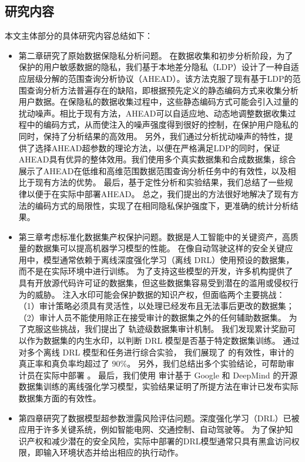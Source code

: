 \subsection{研究内容}
本文主体部分的具体研究内容总结如下：
\begin{itemize}
    \item 第二章研究了原始数据保隐私分析问题。
    在数据收集和初步分析阶段，为了保护的用户敏感数据的隐私，我们基于本地差分隐私（LDP）设计了一种自适应层级分解的范围查询分析协议（AHEAD）。该方法克服了现有基于LDP的范围查询分析方法普遍存在的缺陷，即根据预先定义的静态编码方式来收集分析用户数据。在保隐私的数据收集过程中，这些静态编码方式可能会引入过量的扰动噪声。相比于现有方法，AHEAD可以自适应地、动态地调整数据收集过程中的编码方式，从而使注入的噪声强度得到很好的控制，在保护用户隐私的同时，保持了分析结果的高效用。
    另外，我们通过分析扰动噪声的特性，提供了选择AHEAD超参数的理论方法，以便在严格满足LDP的同时，保证AHEAD具有优异的整体效用。我们使用多个真实数据集和合成数据集，综合展示了AHEAD在低维和高维范围数据范围查询分析任务中的有效性，以及相比于现有方法的优势。
    最后，基于定性分析和实验结果，我们总结了一些规律以便于在实际中部署AHEAD。
    总之，我们提出的方法很好地解决了现有方法的编码方式的局限性，实现了在相同隐私保护强度下，更准确的统计分析结果。
    \item 第三章考虑标准化数据集产权保护问题。数据是人工智能中的关键资产，高质量的数据集可以提高机器学习模型的性能。
    在像自动驾驶这样的安全关键应用中，模型通常依赖于离线深度强化学习（离线 DRL）使用预设的数据集，而不是在实际环境中进行训练。
    为了支持这些模型的开发，许多机构提供了具有开放源代码许可证的数据集，但这些数据集容易受到潜在的滥用或侵权行为的威胁。
    注入水印可能会保护数据的知识产权，但面临两个主要挑战：
    （1）审计策略必须具有灵活性，以处理已经发布且无法事后更改的数据集；
    （2）审计人员不能使用除正在接受审计的数据集之外的任何辅助数据集。
    为了克服这些挑战，我们提出了 \sysnameo 轨迹级数据集审计机制。
    我们发现累计奖励可以作为数据集的内生水印，以判断 DRL 模型是否基于特定数据集训练。
    通过对多个离线 DRL 模型和任务进行综合实验，
    我们展现了 \sysnameo 的有效性，审计的真正率和真负率均超过了 $90\%$。
    另外，我们总结出多个实验结论，可帮助审计员在实际中部署 \sysnameo 。
    最后，我们使用 \sysnameo 审计基于 Google 和 DeepMind 的开源数据集训练的离线强化学习模型，实验结果证明了所提方法在审计已发布实际数据集方面的有效性。
    \item 第四章研究了数据模型超参数泄露风险评估问题。深度强化学习（DRL）已被应用于许多关键系统，例如智能电网、交通控制、自动驾驶等。
    为了保护知识产权和减少潜在的安全风险，实际中部署的DRL模型通常只具有黑盒访问权限，即输入环境状态并给出相应的执行动作。

\end{itemize}
